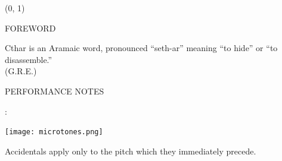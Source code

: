 \documentclass[10pt]{article}
\begin{document}
\begin{textblock}{23}(0, 1)
\begin{center}
\huge FOREWORD
\end{center}
\end{textblock}

\vspace*{0.25\baselineskip}

\begin{center}
Cthar is an Aramaic word, pronounced ``seth-ar'' meaning ``to hide'' or ``to disassemble.''\\
\phantom{text} \hfill (G.R.E.)
  \end{center}
  

\begin{center}
\huge PERFORMANCE NOTES
\end{center}

\begin{center}
:
\end{center}

\begin{center}
\texttt{[image: microtones.png]}
\end{center}

\begin{center}
Accidentals apply only to the pitch which they immediately precede.
\end{center}
\end{document}
